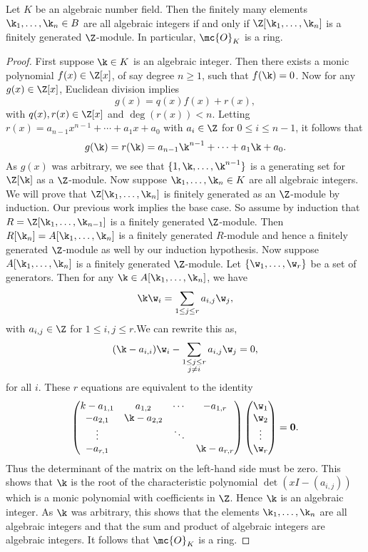    \begin{proposition}\label{prop:algebraic_integer_if_finitely_generated}
      Let $K$ be an algebraic number field. Then the finitely many elements $\k_{1},\ldots,\k_{n} \in B$ are all algebraic integers if and only if $\Z[\k_{1},\ldots,\k_{n}]$ is a finitely generated $\Z$-module. In particular, $\mc{O}_{K}$ is a ring.
    \end{proposition}
    \begin{proof}
      First suppose $\k \in K$ is an algebraic integer. Then there exists a monic polynomial $f(x) \in \Z[x]$, of say degree $n \ge 1$, such that $f(\k) = 0$. Now for any $g(x) \in \Z[x]$, Euclidean division implies
      \[
        g(x) = q(x)f(x)+r(x),
      \]
      with $q(x),r(x) \in \Z[x]$ and $\deg(r(x)) < n$. Letting $r(x) = a_{n-1}x^{n-1}+\cdots+a_{1}x+a_{0}$ with $a_{i} \in \Z$ for $0 \le i \le n-1$, it follows that
      \[
        g(\k) = r(\k) = a_{n-1}\k^{n-1}+\cdots+a_{1}\k+a_{0}.
      \]
      As $g(x)$ was arbitrary, we see that $\{1,\k,\ldots,\k^{n-1}\}$ is a generating set for $\Z[\k]$ as a $\Z$-module. Now suppose $\k_{1},\ldots,\k_{n} \in K$ are all algebraic integers. We will prove that $\Z[\k_{1},\ldots,\k_{n}]$ is finitely generated as an $\Z$-module by induction. Our previous work implies the base case. So assume by induction that $R = \Z[\k_{1},\ldots,\k_{n-1}]$ is a finitely generated $\Z$-module. Then $R[\k_{n}] = A[\k_{1},\ldots,\k_{n}]$ is a finitely generated $R$-module and hence a finitely generated $\Z$-module as well by our induction hypothesis. Now suppose $A[\k_{1},\ldots,\k_{n}]$ is a finitely generated $\Z$-module. Let $\{\w_{1},\ldots,\w_{r}\}$ be a set of generators. Then for any $\k \in A[\k_{1},\ldots,\k_{n}]$, we have
      \[
        \k\w_{i} = \sum_{1 \le j \le r}a_{i,j}\w_{j},
      \]
      with $a_{i,j} \in \Z$ for $1 \le i,j \le r$.We can rewrite this as,
      \[
        (\k-a_{i,i})\w_{i}-\sum_{\substack{1 \le j \le r \\ j \neq i}}a_{i,j}\w_{j} = 0,
      \]
      for all $i$. These $r$ equations are equivalent to the identity
      \[
        \begin{pmatrix} k-a_{1,1} & a_{1,2} & \cdots & -a_{1,r} \\ -a_{2,1} & \k-a_{2,2} & & \\ \vdots & & \ddots & \\ -a_{r,1} & & & \k-a_{r,r} \end{pmatrix}\begin{pmatrix} \w_{1} \\ \w_{2} \\ \vdots \\ \w_{r} \end{pmatrix} = \mathbf{0}.
      \]
      Thus the determinant of the matrix on the left-hand side must be zero. This shows that $\k$ is the root of the characteristic polynomial $\det(xI-(a_{i,j}))$ which is a monic polynomial with coefficients in $\Z$. Hence $\k$ is an algebraic integer. As $\k$ was arbitrary, this shows that the elements $\k_{1},\ldots,\k_{n}$ are all algebraic integers and that the sum and product of algebraic integers are algebraic integers. It follows that $\mc{O}_{K}$ is a ring.
    \end{proof}

